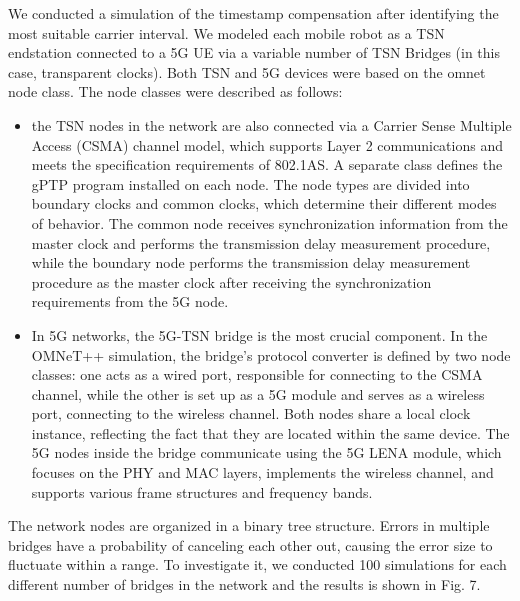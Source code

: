 \documentclass[english]{cccconf}
\begin{document}
We conducted a simulation of the timestamp compensation after identifying the most suitable carrier interval. We modeled each mobile robot as a TSN endstation connected to a 5G UE via a variable number of TSN Bridges (in this case, transparent clocks). Both TSN and 5G devices were based on the omnet node class. The node classes were described as follows:
\begin{itemize}
	\item the TSN nodes in the network are also connected via a Carrier Sense Multiple Access (CSMA) channel model, which supports Layer 2 communications and meets the specification requirements of 802.1AS. A separate class defines the gPTP program installed on each node. The node types are divided into boundary clocks and common clocks, which determine their different modes of behavior. The common node receives synchronization information from the master clock and performs the transmission delay measurement procedure, while the boundary node performs the transmission delay measurement procedure as the master clock after receiving the synchronization requirements from the 5G node.
	\item In 5G networks, the 5G-TSN bridge is the most crucial component. In the OMNeT++ simulation, the bridge's protocol converter is defined by two node classes: one acts as a wired port, responsible for connecting to the CSMA channel, while the other is set up as a 5G module and serves as a wireless port, connecting to the wireless channel. Both nodes share a local clock instance, reflecting the fact that they are located within the same device. The 5G nodes inside the bridge communicate using the 5G LENA module, which focuses on the PHY and MAC layers, implements the wireless channel, and supports various frame structures and frequency bands.
\end{itemize}
The network nodes are organized in a binary tree structure. Errors in multiple bridges have a probability of canceling each other out, causing the error size to fluctuate within a range. To investigate it, we conducted 100 simulations for each different number of bridges in the network and the results is shown in Fig. 7.
\end{document}
